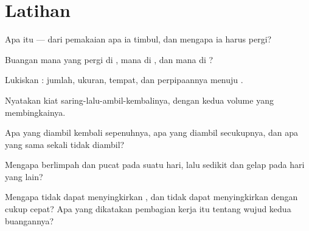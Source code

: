 \section{Latihan}

\begin{exercise}[$\star$]\label{exo:g7:removing-wastes:1}
Apa itu  --- dari pemakaian apa ia timbul, dan mengapa ia harus
pergi?
\end{exercise}

\begin{exercise}[$\star$]\label{exo:g7:removing-wastes:2}
Buangan mana yang pergi di , mana di , dan mana
di ?
\end{exercise}

\begin{exercise}[$\star$]\label{exo:g7:removing-wastes:3}
Lukiskan : jumlah, ukuran, tempat, dan perpipaannya menuju
.
\end{exercise}

\begin{exercise}[$\star$]\label{exo:g7:removing-wastes:4}
Nyatakan kiat saring-lalu-ambil-kembalinya, dengan kedua volume yang
membingkainya.
\end{exercise}

\begin{exercise}[$\star$]\label{exo:g7:removing-wastes:5}
Apa yang diambil kembali sepenuhnya, apa yang diambil secukupnya, dan
apa yang sama sekali tidak diambil?
\end{exercise}

\begin{exercise}[$\star$]\label{exo:g7:removing-wastes:6}
Mengapa  berlimpah dan pucat pada suatu hari, lalu sedikit dan
gelap pada hari yang lain?
\end{exercise}

\begin{exercise}[$\star\star$]\label{exo:g7:removing-wastes:7}
Mengapa  tidak dapat menyingkirkan , dan  tidak
dapat menyingkirkan  dengan cukup cepat? Apa yang
dikatakan pembagian kerja itu tentang wujud kedua buangannya?
\end{exercise}


